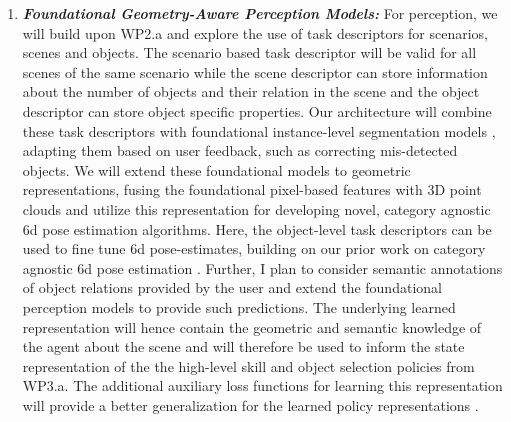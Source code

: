 \documentclass{erc-B2}
\begin{document}
\begin{enumerate}
\item \textit{\textbf{Foundational Geometry-Aware Perception Models:}} 
For perception, we will build upon WP2.a and explore the use of task descriptors for scenarios, scenes and objects. The scenario based task descriptor will be valid for all scenes of the same scenario while the scene descriptor can store information about the number of objects and their relation in the scene and the object descriptor can store object specific properties. Our architecture will combine these task descriptors with foundational instance-level segmentation models \cite{SAM,liu2023grounding}, adapting them based on user feedback, such as correcting mis-detected objects. We will extend these foundational models to geometric representations, fusing the foundational pixel-based features with 3D point clouds and utilize this representation for developing novel, category agnostic \gls*{6d} pose estimation algorithms. Here, the object-level task descriptors can be used to fine tune \gls*{6d} pose-estimates, building on our prior work on category agnostic \gls*{6d} pose estimation \cite{gao2023sad}. Further, I plan to consider semantic annotations of object relations provided by the user and extend the foundational perception models to provide such predictions. The underlying learned representation will hence contain the geometric and semantic knowledge of the agent about the scene and will therefore be used to inform the state representation of the the high-level skill and object selection policies from WP3.a. The additional auxiliary loss functions for learning this representation will provide a better generalization for the learned policy representations . 
 


\end{enumerate}
\end{document}
